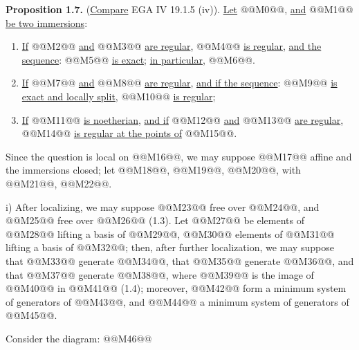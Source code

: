 \textbf{Proposition 1.7.} (\uline{Compare} EGA IV 19.1.5 (iv)). \uline{Let} @@M0@@, \uline{and} @@M1@@ \uline{be two immersions}:
\begin{enumerate}[label=\roman*)]
\item \uline{If} @@M2@@ \uline{and} @@M3@@ \uline{are regular}, @@M4@@ \uline{is regular}, \uline{and the sequence}:
@@M5@@
\uline{is exact}; \uline{in particular}, @@M6@@.
\item \uline{If} @@M7@@ \uline{and} @@M8@@ \uline{are regular}, \uline{and if the sequence}:
@@M9@@
\uline{is exact and locally split}, @@M10@@ \uline{is regular};
\item \uline{If} @@M11@@ \uline{is noetherian}, \uline{and if} @@M12@@ \uline{and} @@M13@@ \uline{are regular}, @@M14@@ \uline{is regular at the points of} @@M15@@.
\end{enumerate}

Since the question is local on @@M16@@, we may suppose @@M17@@ affine and the immersions closed; let @@M18@@, @@M19@@, @@M20@@, with @@M21@@, @@M22@@.

i) After localizing, we may suppose @@M23@@ free over @@M24@@, and @@M25@@ free over @@M26@@ (1.3). Let @@M27@@ be elements of @@M28@@ lifting a basis of @@M29@@, @@M30@@ elements of @@M31@@ lifting a basis of @@M32@@; then, after further localization, we may suppose that @@M33@@ generate @@M34@@, that @@M35@@ generate @@M36@@, and that @@M37@@ generate @@M38@@, where @@M39@@ is the image of @@M40@@ in @@M41@@ (1.4); moreover, @@M42@@ form a minimum system of generators of @@M43@@, and @@M44@@ a minimum system of generators of @@M45@@.

Consider the diagram:
@@M46@@
